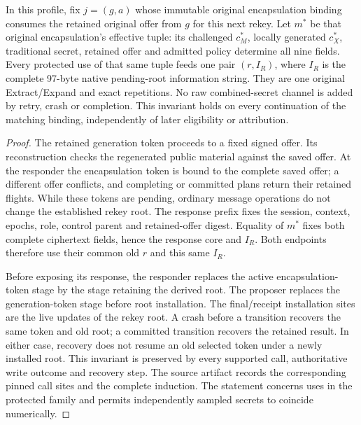 \begin{lemma}
\label{lem:cb-native-root-use}
In this profile, fix $j=(g,a)$ whose immutable original encapsulation
binding consumes the retained original offer from $g$ for this next rekey.
Let $m^*$ be that original encapsulation's effective tuple: its challenged
$c_M^*$, locally generated $c_X^*$, traditional secret, retained offer and
admitted policy determine all nine fields. Every protected
use of that same tuple feeds one pair $(r,I_R)$, where $I_R$ is the complete
97-byte native pending-root information string. They are one original
Extract/Expand and exact repetitions. No raw combined-secret channel is
added by retry, crash or completion. This invariant holds on every
continuation of the matching binding, independently of later eligibility
or attribution.
\end{lemma}
\begin{proof}
The retained generation token proceeds to a fixed signed offer. Its
reconstruction checks the regenerated public material against the saved
offer. At the responder the encapsulation token is bound to the complete
saved offer; a different offer conflicts, and completing or committed
plans return their retained flights. While these tokens are pending,
ordinary message operations do not change the established rekey root.
The response prefix fixes the session, context, epochs, role, control
parent and retained-offer digest. Equality of $m^*$ fixes both complete
ciphertext fields, hence the response core and $I_R$. Both endpoints
therefore use their common old $r$ and this same $I_R$.

Before exposing its response, the responder replaces the active
encapsulation-token stage by the stage retaining the derived root.
The proposer replaces the generation-token stage before root installation.
The final/receipt installation sites are the live updates of the rekey
root. A crash before a transition recovers the same token and old root; a
committed transition recovers the retained result. In either case, recovery
does not resume an old selected token under a newly installed root. This invariant is preserved
by every supported call, authoritative write outcome and recovery step.
The source artifact records the corresponding pinned call sites and the
complete induction. The statement concerns uses in the protected family
and permits independently sampled secrets to coincide numerically.
\end{proof}

